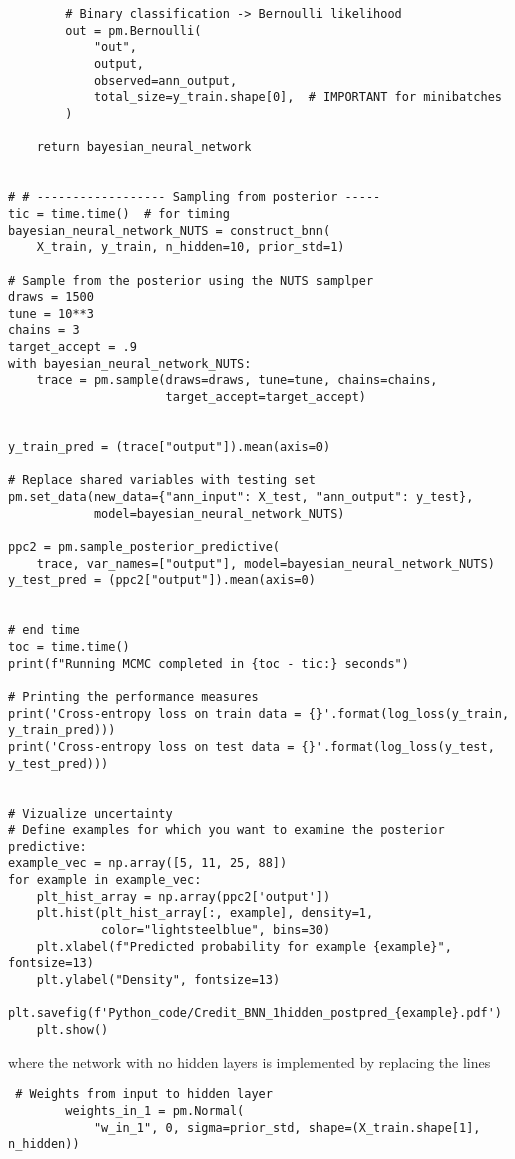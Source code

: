 \begin{appendices}
\begin{lstlisting}
        # Binary classification -> Bernoulli likelihood
        out = pm.Bernoulli(
            "out",
            output,
            observed=ann_output,
            total_size=y_train.shape[0],  # IMPORTANT for minibatches
        )

    return bayesian_neural_network


# # ------------------ Sampling from posterior -----
tic = time.time()  # for timing
bayesian_neural_network_NUTS = construct_bnn(
    X_train, y_train, n_hidden=10, prior_std=1)

# Sample from the posterior using the NUTS samplper
draws = 1500
tune = 10**3
chains = 3
target_accept = .9
with bayesian_neural_network_NUTS:
    trace = pm.sample(draws=draws, tune=tune, chains=chains,
                      target_accept=target_accept)


y_train_pred = (trace["output"]).mean(axis=0)

# Replace shared variables with testing set
pm.set_data(new_data={"ann_input": X_test, "ann_output": y_test},
            model=bayesian_neural_network_NUTS)

ppc2 = pm.sample_posterior_predictive(
    trace, var_names=["output"], model=bayesian_neural_network_NUTS)
y_test_pred = (ppc2["output"]).mean(axis=0)


# end time
toc = time.time()
print(f"Running MCMC completed in {toc - tic:} seconds")

# Printing the performance measures
print('Cross-entropy loss on train data = {}'.format(log_loss(y_train, y_train_pred)))
print('Cross-entropy loss on test data = {}'.format(log_loss(y_test, y_test_pred)))


# Vizualize uncertainty
# Define examples for which you want to examine the posterior predictive:
example_vec = np.array([5, 11, 25, 88])
for example in example_vec:
    plt_hist_array = np.array(ppc2['output'])
    plt.hist(plt_hist_array[:, example], density=1,
             color="lightsteelblue", bins=30)
    plt.xlabel(f"Predicted probability for example {example}", fontsize=13)
    plt.ylabel("Density", fontsize=13)
    plt.savefig(f'Python_code/Credit_BNN_1hidden_postpred_{example}.pdf')
    plt.show()

\end{lstlisting}
where the network with no hidden layers is implemented by replacing the lines
\begin{lstlisting}
 # Weights from input to hidden layer
        weights_in_1 = pm.Normal(
            "w_in_1", 0, sigma=prior_std, shape=(X_train.shape[1], n_hidden))


\end{lstlisting}
\end{appendices}
